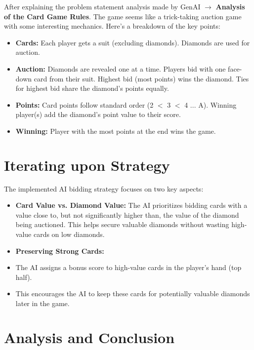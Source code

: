 \documentclass[12pt]{article} %
\begin{document}
After explaining the problem statement analysis made by GenAI $\rightarrow$ \textbf{Analysis of the Card Game Rules}. The game seems like a trick-taking auction game with some interesting mechanics. Here's a breakdown of the key points:
\begin{itemize}
    \item \textbf{Cards:}
         Each player gets a suit (excluding diamonds).
        Diamonds are used for auction.

    \item \textbf{Auction:}
     Diamonds are revealed one at a time.
         Players bid with one face-down card from their suit.
         Highest bid (most points) wins the diamond.
       Ties for highest bid share the diamond's points equally.

    \item \textbf{Points:}
         Card points follow standard order (2 $<$ 3 $<$ 4 ... A).
       Winning player(s) add the diamond's point value to their score.
    \item \textbf{Winning:}
        Player with the most points at the end wins the game.
\end{itemize}

\section*{\textbf{Iterating upon Strategy}}

The implemented AI bidding strategy focuses on two key aspects:
\begin{itemize}
    \item \textbf{Card Value vs. Diamond Value:}
        The AI prioritizes bidding cards with a value close to, but not significantly higher than, the value of the diamond being auctioned.
         This helps secure valuable diamonds without wasting high-value cards on low diamonds.
 
    \item \textbf{Preserving Strong Cards:}
        \item The AI assigns a bonus score to high-value cards in the player's hand (top half).
        \item This encourages the AI to keep these cards for potentially valuable diamonds later in the game.
  
\end{itemize}

\section*{\textbf{Analysis and Conclusion}}
\end{document}
